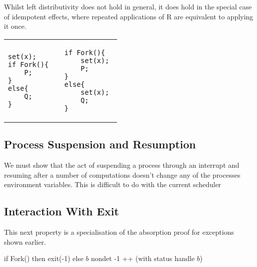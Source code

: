 \documentclass[logo,bsc,singlespacing,parskip]{infthesis}
\begin{document}
Whilst left distributivity does not hold in general, it does hold in the special case of idempotent effects, where repeated applications of R are equivalent to applying it once.

\vspace{-2em}
\begin{table}[H]
\centering
\begin{tabular}{p{} c p{}}
\begin{lstlisting}
set(x);
if Fork(){
    P;
}
else{
    Q;
}
\end{lstlisting}
&
&
\begin{lstlisting}
if Fork(){
    set(x); 
    P;
}
else{ 
    set(x); 
    Q;
}
\end{lstlisting}
\end{tabular}
\end{table}
\vspace{-2em}


\subsection*{Process Suspension and Resumption}
We must show that the act of suspending a process through an interrupt and resuming after a number of computations doesn't change any of the processes environment variables. This is difficult to do with the current scheduler 

\subsection*{Interaction With Exit}
This next property is a specialisation of the absorption proof for exceptions shown earlier.


{if Fork() then exit(-1) else $b$}
{nondet}
{-1 ++ (with status handle $b$)}
\end{document}

